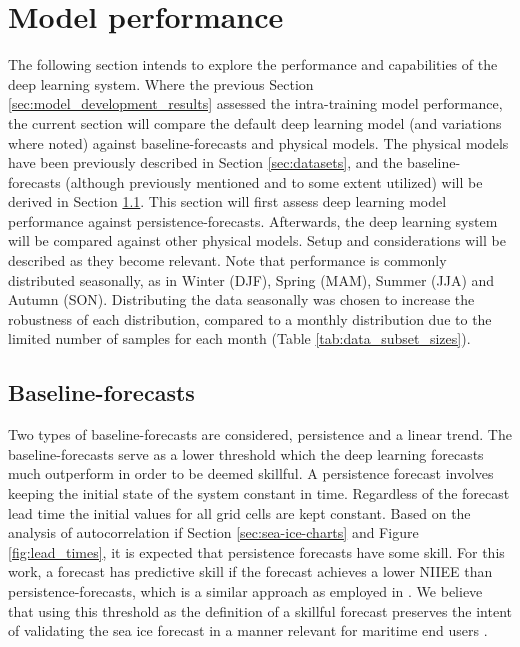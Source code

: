 \documentclass[../main/thesis.tex]{subfiles}
\begin{document}
\section{Model performance}
\label{sec:model-perf}
The following section intends to explore the performance and capabilities of the deep learning system. Where the previous Section \ref{sec:model_development_results} assessed the intra-training model performance, the current section will compare the default deep learning model (and variations where noted) against baseline-forecasts and physical models. The physical models have been previously described in Section \ref{sec:datasets}, and the baseline-forecasts (although previously mentioned and to some extent utilized) will be derived in Section \ref{sec:baselines}. This section will first assess deep learning model performance against persistence-forecasts. Afterwards, the deep learning system will be compared against other physical models. Setup and considerations will be described as they become relevant. Note that performance is commonly distributed seasonally, as in Winter (DJF), Spring (MAM), Summer (JJA) and Autumn (SON). Distributing the data seasonally was chosen to increase the robustness of each distribution, compared to a monthly distribution due to the limited number of samples for each month (Table \ref{tab:data_subset_sizes}).

\subsection{Baseline-forecasts}
\label{sec:baselines}
Two types of baseline-forecasts are considered, persistence and a linear trend. The baseline-forecasts serve as a lower threshold which the deep learning forecasts much outperform in order to be deemed skillful. A persistence forecast involves keeping the initial state of the system constant in time. Regardless of the forecast lead time the initial values for all grid cells are kept constant. Based on the analysis of autocorrelation if Section \ref{sec:sea-ice-charts} and Figure \ref{fig:lead_times}, it is expected that persistence forecasts have some skill. For this work, a forecast has predictive skill if the forecast achieves a lower NIIEE than persistence-forecasts, which is a similar approach as employed in \citet{Zampieri2019}. We believe that using this threshold as the definition of a skillful forecast preserves the intent of validating the sea ice forecast in a manner relevant for maritime end users \citep{Melsom2019, Veland2021}.
\end{document}
